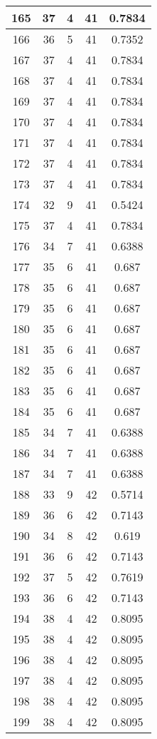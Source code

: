 \documentclass[letterpaper, 12pt]{article}
\begin{document}
\begin{longtable}{|c|c|c|c|c|}
\hline
165 & 37 & 4 & 41 & 0.7834 \\
\hline
166 & 36 & 5 & 41 & 0.7352 \\
\hline
167 & 37 & 4 & 41 & 0.7834 \\
\hline
168 & 37 & 4 & 41 & 0.7834 \\
\hline
169 & 37 & 4 & 41 & 0.7834 \\
\hline
170 & 37 & 4 & 41 & 0.7834 \\
\hline
171 & 37 & 4 & 41 & 0.7834 \\
\hline
172 & 37 & 4 & 41 & 0.7834 \\
\hline
173 & 37 & 4 & 41 & 0.7834 \\
\hline
174 & 32 & 9 & 41 & 0.5424 \\
\hline
175 & 37 & 4 & 41 & 0.7834 \\
\hline
176 & 34 & 7 & 41 & 0.6388 \\
\hline
177 & 35 & 6 & 41 & 0.687 \\
\hline
178 & 35 & 6 & 41 & 0.687 \\
\hline
179 & 35 & 6 & 41 & 0.687 \\
\hline
180 & 35 & 6 & 41 & 0.687 \\
\hline
181 & 35 & 6 & 41 & 0.687 \\
\hline
182 & 35 & 6 & 41 & 0.687 \\
\hline
183 & 35 & 6 & 41 & 0.687 \\
\hline
184 & 35 & 6 & 41 & 0.687 \\
\hline
185 & 34 & 7 & 41 & 0.6388 \\
\hline
186 & 34 & 7 & 41 & 0.6388 \\
\hline
187 & 34 & 7 & 41 & 0.6388 \\
\hline
188 & 33 & 9 & 42 & 0.5714 \\
\hline
189 & 36 & 6 & 42 & 0.7143 \\
\hline
190 & 34 & 8 & 42 & 0.619 \\
\hline
191 & 36 & 6 & 42 & 0.7143 \\
\hline
192 & 37 & 5 & 42 & 0.7619 \\
\hline
193 & 36 & 6 & 42 & 0.7143 \\
\hline
194 & 38 & 4 & 42 & 0.8095 \\
\hline
195 & 38 & 4 & 42 & 0.8095 \\
\hline
196 & 38 & 4 & 42 & 0.8095 \\
\hline
197 & 38 & 4 & 42 & 0.8095 \\
\hline
198 & 38 & 4 & 42 & 0.8095 \\
\hline
199 & 38 & 4 & 42 & 0.8095 \\
\hline
\end{longtable}
\end{document}
